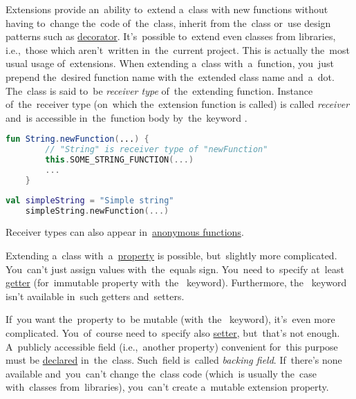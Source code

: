 \label{kotlinextensions}
Extensions provide an~ability to~extend a~class with new functions without having to~change the~code of~the~class, inherit from the~class or~use design patterns such as \hyperref[decoratordp]{decorator}.
It's~possible to~extend even classes from libraries, i.e.,~those which aren't~written in~the~current project.
This is actually the~most usual usage of~extensions.
When extending a~class with~a~function, you~just prepend the~desired function name with the~extended class name and~a~dot.
The~class is said to~be \textit{receiver type} of~the~extending function.
Instance of~the~receiver type (on~which the~extension function is called) is called \textit{receiver} and~is accessible in~the~function body by~the~keyword .

\begin{lstlisting}[language=Kotlin, title={Extension definition}]
    fun String.newFunction(...) {
        // "String" is receiver type of "newFunction"
        this.SOME_STRING_FUNCTION(...)
        ...
    }
\end{lstlisting}
\newpage

\begin{lstlisting}[language=Kotlin, title={Usage}]
    val simpleString = "Simple string"
    simpleString.newFunction(...)
\end{lstlisting}

\note Receiver types can also appear in~\hyperref[kotlinanonymousfunction]{anonymous functions}.

\label{kotlinextensionproperty}
\noindent Extending a~class with~a~\hyperref[variablefieldproperty]{property} is possible, but~slightly more complicated.
You~can't just assign values with~the~equals sign.
You~need to~specify at~least \hyperref[kotlingetset]{getter} (for~immutable property \mbox{with the } keyword).
Furthermore, \mbox{the \hyperref[kotlingetset]{}} keyword isn't available in~such getters and~setters.

If~you want the~property to~be mutable (\mbox{with the } keyword), it's~even more complicated.
You~of~course need to~specify also \hyperref[kotlingetset]{setter}, but~that's not enough.
A~publicly accessible field (i.e.,~another property) convenient for~this purpose must be \hyperref[declarationdefinition]{declared} in~the~class.
Such~field is~called \textit{backing field}.
If~there's none available and~you~can't change the~class code (which~is usually the~case with~classes from~libraries), you~can't create a~mutable extension property.

